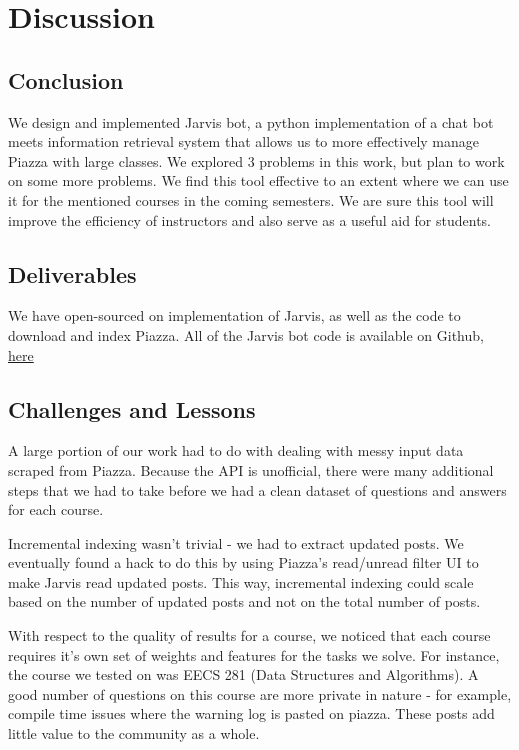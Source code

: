 \documentclass[sigconf]{acmart}
\begin{document}
\section{Discussion}

\subsection{Conclusion}
We design and implemented Jarvis bot, a python implementation of a chat bot meets information retrieval system that allows us to more effectively manage Piazza with large classes. We explored 3 problems in this work, but plan to work on some more problems. We find this tool effective to an extent where we can use it for the mentioned courses in the coming semesters. We are sure this tool will improve the efficiency of instructors and also serve as a useful aid for students.

\subsection{Deliverables}
We have open-sourced on implementation of Jarvis, as well as the code to download and index Piazza. All of the Jarvis bot code is available on Github, \href{https://github.com/pranavr93/piazza_bot}{here}

\subsection{Challenges and Lessons}
A large portion of our work had to do with dealing with messy input data scraped from Piazza. Because the API is unofficial, there were many additional steps that we had to take before we had a clean dataset of questions and answers for each course. 

Incremental indexing wasn't trivial - we had to extract updated posts. We eventually found a hack to do this by using Piazza's read/unread filter UI to make Jarvis read updated posts. This way, incremental indexing could scale based on the number of updated posts and not on the total number of posts.

With respect to the quality of results for a course, we noticed that each course requires it's own set of weights and features for the tasks we solve. For instance, the course we tested on was EECS 281 (Data Structures and Algorithms). A good number of questions on this course are more private in nature - for example, compile time issues where the warning log is pasted on piazza. These posts add little value to the community as a whole.
\end{document}
